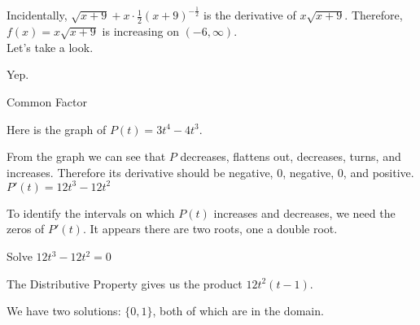 \documentclass{ximera}
\begin{document}
Incidentally, $\sqrt{x+9} + x \cdot \frac{1}{2} (x+9)^{-\tfrac{1}{2}}$ is the derivative of $x \sqrt{x+9}$. Therefore, $f(x) = x \sqrt{x+9}$ is increasing on $(-6, \infty)$. \\

Let's take a look.







\begin{center}
\end{center}


Yep.








\begin{example}  Common Factor


Here is the graph of $P(t) = 3 t^4 - 4 t^3$.



\begin{center}
\end{center}


From the graph we can see that $P$ decreases, flattens out, decreases, turns, and increases.  Therefore its derivative should be negative, $0$, negative, $0$, and positive. \\



$P'(t) = 12 t^3 - 12 t^2$ \\




\begin{center}
\end{center}



To identify the intervals on which $P(t)$ increases and decreases, we need the zeros of $P'(t)$.  It appears there are two roots, one a double root.






Solve $12 t^3 - 12 t^2 = 0$


\begin{explanation}

The Distributive Property gives us the product $12 t^2 (t-1)$.




We have two solutions: $\{ 0, 1  \}$, both of which are in the domain.





\end{explanation}
\end{example}
\end{document}
